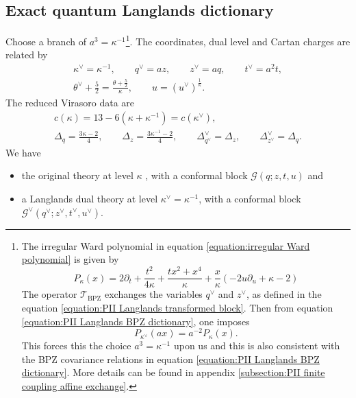 \documentclass[a4paper,11pt]{article}
\numberwithin{equation}{section}
\begin{document}
\subsection{Exact quantum Langlands dictionary}
\label{subsection:PII finite coupling dictionary}
Choose a branch of $a^{3}=\kappa^{-1}$\footnote{The irregular Ward polynomial in equation \eqref{equation:irregular Ward polynomial} is given by 
\begin{equation*}
P_\kappa(x) = 2\partial_t + \frac{t^2}{4\kappa} + \frac{tx^2 + x^4}{\kappa} + \frac{x}{\kappa}(-2u\partial_u + \kappa -2)
\end{equation*}
The operator $\mathcal{T}_{\mathrm{BPZ}}$ exchanges the variables $q^\vee$ and $z^\vee$, as defined in the equation \eqref{equation:PII Langlands transformed block}. Then from equation \eqref{equation:PII Langlands BPZ dictionary}, one imposes 
\begin{equation*}
 P_{\kappa^\vee}(a x) = a^{-2} P_\kappa (x).
 \end{equation*} This forces this the choice $a^3 = \kappa^{-1}$ upon us and this is also consistent with the BPZ covariance relations in equation \eqref{equation:PII Langlands BPZ dictionary}. More details can be found in appendix \ref{subsection:PII finite coupling affine exchange}.}.  The coordinates, dual level
and Cartan charges are related by
\begin{equation}
	\label{equation:PII Langlands finite coordinate map}
	\begin{gathered}
		\kappa^{\vee}=\kappa^{-1},\qquad
		q^{\vee}=az,\qquad z^{\vee}=aq,\qquad
		t^{\vee}=a^{2}t,\\
		\theta^{\vee}+\frac{5}{2}
		=\frac{\theta+\frac{5}{2}}{\kappa},\qquad
		u=(u^{\vee})^{\frac{1}{\kappa}}.
	\end{gathered}
\end{equation}
The reduced Virasoro data are
\begin{equation}
	\begin{gathered}
		c(\kappa)=13-6\left(\kappa+\kappa^{-1}\right)
		=c(\kappa^{\vee}),\\
		\Delta_{q}=\frac{3\kappa-2}{4},\qquad
		\Delta_{z}=\frac{3\kappa^{-1}-2}{4},\qquad
		\Delta^{\vee}_{q^{\vee}}=\Delta_{z},\qquad
		\Delta^{\vee}_{z^{\vee}}=\Delta_{q}.
	\end{gathered}
\end{equation}
We have 
\begin{itemize}
    \item the original theory at level $\kappa$ 
    , with a conformal block $\mathcal{G} (q;z,t,u)$ and 
     \item a Langlands dual theory at level $\kappa^\vee = \kappa^{-1}$, with a conformal block $\mathcal{G}^\vee(q^\vee; z^\vee,t^\vee,u^\vee)$.
\end{itemize}
\end{document}
